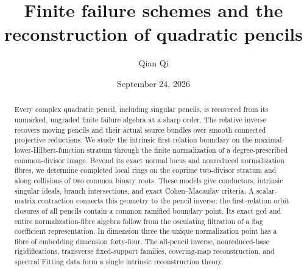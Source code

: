 \title[Finite failure schemes and quadratic pencils]{Finite failure schemes and the reconstruction of quadratic pencils}
\author{Qian Qi}
\date{September 24, 2026}
\begin{abstract}
Every complex quadratic pencil, including singular pencils, is recovered
from its unmarked, ungraded finite failure algebra at a sharp order.
The relative inverse recovers moving pencils and their actual source
bundles over smooth connected projective reductions.
We study the intrinsic first-relation boundary on the
maximal-lower-Hilbert-function stratum through the finite normalization
of a degree-prescribed common-divisor image.  Beyond its exact normal
locus and nonreduced normalization fibres, we determine completed
local rings on the coprime two-divisor stratum and along collisions
of two common binary roots.  These models give conductors, intrinsic
singular ideals, branch intersections, and exact Cohen--Macaulay
criteria.  A scalar-matrix contraction connects this geometry to the
pencil inverse: the first-relation orbit closures of all pencils
contain a common ramified boundary point.  Its exact gcd and entire
normalization-fibre algebra follow from the osculating filtration of
a flag coefficient representation.  In dimension three the unique
normalization point has a fibre of embedding dimension forty-four.
The all-pencil inverse, nonreduced-base rigidifications, transverse
fixed-support families, covering-map reconstruction, and spectral
Fitting data form a single intrinsic reconstruction theory.
\end{abstract}
\maketitle
